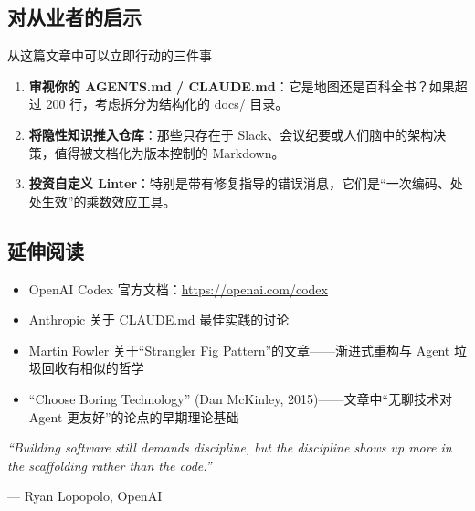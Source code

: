 \subsection{对从业者的启示}

\begin{knowledgebox}{从这篇文章中可以立即行动的三件事}
\begin{enumerate}[nosep]
  \item \textbf{审视你的 AGENTS.md / CLAUDE.md}：它是地图还是百科全书？如果超过 200 行，考虑拆分为结构化的 docs/ 目录。
  \item \textbf{将隐性知识推入仓库}：那些只存在于 Slack、会议纪要或人们脑中的架构决策，值得被文档化为版本控制的 Markdown。
  \item \textbf{投资自定义 Linter}：特别是带有修复指导的错误消息，它们是``一次编码、处处生效''的乘数效应工具。
\end{enumerate}
\end{knowledgebox}

\subsection{延伸阅读}

\begin{itemize}[nosep]
  \item OpenAI Codex 官方文档：\url{https://openai.com/codex}
  \item Anthropic 关于 CLAUDE.md 最佳实践的讨论
  \item Martin Fowler 关于``Strangler Fig Pattern''的文章——渐进式重构与 Agent 垃圾回收有相似的哲学
  \item ``Choose Boring Technology'' (Dan McKinley, 2015)——文章中``无聊技术对 Agent 更友好''的论点的早期理论基础
\end{itemize}

\vspace{1em}

\begin{center}
\textit{``Building software still demands discipline, but the discipline shows up more in the scaffolding rather than the code.''}

--- Ryan Lopopolo, OpenAI
\end{center}



